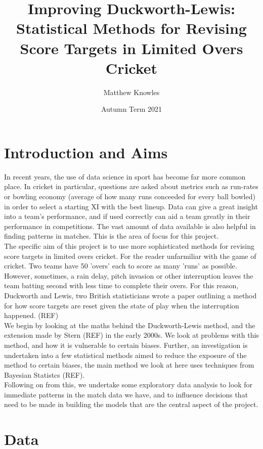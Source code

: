 \documentclass[11pt]{amsart}
\title{Improving Duckworth-Lewis: Statistical Methods for Revising Score Targets in Limited Overs Cricket}
\author{Matthew Knowles}
\date{Autumn Term 2021}
\begin{document}
\maketitle

\section{Introduction and Aims}
In recent years, the use of data science in sport has become far more common place. In cricket in particular, questions are asked about metrics such 
as run-rates or bowling economy (average of how many runs conceeded for every ball bowled) in order to select a starting XI with the best lineup. 
Data can give a great insight into a team's performance, and if used correctly can aid a team greatly in their performance in competitions.  The vast amount
of data available is also helpful in finding patterns in matches. This is the area of focus for this project. \\

The specific aim of this project is to use more sophisticated methods for revising score targets in limited overs cricket. For the reader unfarmiliar 
with the game of cricket. Two teams have 50 'overs' each to score as many 'runs' as possible. However, sometimes, a rain delay, pitch invasion 
or other interruption leaves the team batting second with less time to complete their overs. For this reason, Duckworth and Lewis, two British 
statisticians wrote a paper outlining a method for how score targets are reset given the state of play when the interruption happened. (REF)\\

We begin by looking at the maths behind the Duckworth-Lewis method, and the extension made by Stern (REF) in the early 2000s. We look at problems
with this method, and how it is vulnerable to certain biases. Further, an investigation is undertaken into a few statistical methods aimed to 
reduce the exposure of the method to certain biases, the main method we look at here uses techniques from Bayesian Statistcs (REF).\\

Following on from this, we undertake some exploratory data analysis to look for immediate patterns in the match data we have, and to influence decisions
that need to be made in building the models that are the central aspect of the project. 

\section{Data}
\end{document}
